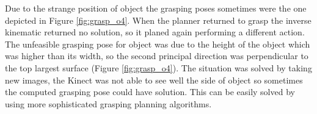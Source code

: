 Due to the strange position of object  the grasping poses sometimes were the one depicted in Figure \ref{fig:grasp_o4}. When the planner returned to grasp  the inverse kinematic returned no solution, so it planed again performing a different action. The unfeasible grasping pose for object  was due to the height of the object which was higher than its width, so the second principal direction was perpendicular to the top largest surface (Figure \ref{fig:grasp_o4}). The situation was solved by taking new images, the Kinect was not able to see well the side of object  so sometimes the computed grasping pose could have solution. This can be easily solved by using more sophisticated grasping planning algorithms. 

